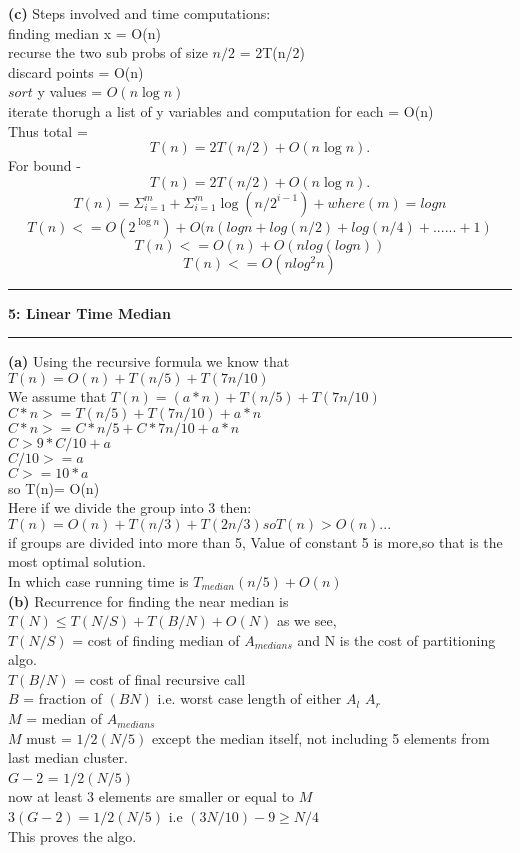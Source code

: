 \documentclass[11pt]{article}
\newcommand\question[2]{\vspace{.25in}\hrule\textbf{#1: #2}\vspace{.5em}\hrule\vspace{.10in}}
\renewcommand\part[1]{\vspace{.10in}\textbf{(#1)}}
\begin{document}
\part{c} Steps involved and time computations:
\\finding median x = O(n)
\\recurse the two sub probs of size $n/2$  = 2T(n/2)
\\discard points = O(n)
\\$sort$ y values = $O(n \log n)$
\\iterate thorugh a list of y variables and computation for each = O(n)
\\Thus total = \[ T(n) = 2T(n/2) + O(n \log n). \]
For bound -
\[ T(n) = 2T(n/2) + O(n \log n). \]
\[ T(n) = \Sigma_{i=1}^m + \Sigma_{i=1}^m \log(n/2^{i-1}) + {where } (m) = log n\] 
\[ T(n) <= O(2^{\log n}) + O(n(log n + log (n/2) + log(n/4) + ...... + 1) \]
\[ T(n) <= O(n) + O(n log(log n)) \]
\[ T(n) <= O(n log^2 n) \]

\question{5}{Linear Time Median}
\part{a} Using the recursive formula we know that $T(n)=O(n) + T(n/5) + T(7n/10)$
\\We assume that $T(n) = (a*n) + T(n/5) + T(7n/10)$
\\$C*n>=T(n/5) + T(7n/10) +a*n$
\\$C*n>=C*n/5 + C*7n/10 +a*n$
\\$C>9*C/10 + a$
\\$C/10 >= a$ 
\\$C>=10*a$
\\so T(n)= O(n)
\\Here if we divide the group into 3 then:
\\$T(n)=O(n) + T(n/3) + T(2n/3) so T(n) > O(n)...$
\\if groups are divided into more than 5, Value of constant 5 is more,so that is the most optimal solution.
\\In which case running time is $T_{median}(n/5) + O(n)$ 
\\[10pt]
\part{b} Recurrence for finding the near median is $T(N) \leq T(N/S) + T(B/N) +O(N)$ as we see,
\\$T(N/S)$ = cost of finding median of $A_{medians}$ and N is the cost of partitioning algo.
\\$T(B/N)$ = cost of final recursive call
\\$B$ = fraction of $(BN)$ i.e. worst case length of either $A_{l}$ $A_{r}$
\\$M$ = median of $A_{medians}$
\\$M$ must = $1/2(N/5)$ except the median itself, not including 5 elements from last median cluster.
\\$G-2$ = $1/2(N/5)$
\\now at least 3 elements are smaller or equal to $M$
\\$3(G-2) = 1/2(N/5)$ i.e $(3N/10) - 9 \geqslant N/4$
\\This proves the algo. 
\end{document}
